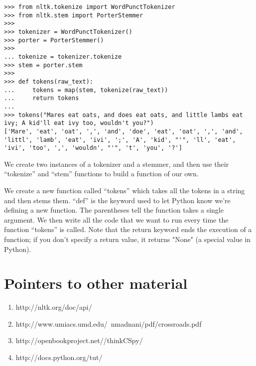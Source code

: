 \documentclass[12pt]{article}
\newenvironment{mylisting}
{\begin{list}{}{\setlength{\leftmargin}{1em}}\item\scriptsize\bfseries}
{\end{list}}
\begin{document}
\begin{mylisting}
\begin{verbatim}
>>> from nltk.tokenize import WordPunctTokenizer
>>> from nltk.stem import PorterStemmer
>>> 
>>> tokenizer = WordPunctTokenizer()
>>> porter = PorterStemmer()
>>>     
... tokenize = tokenizer.tokenize
>>> stem = porter.stem
>>> 
>>> def tokens(raw_text):
...     tokens = map(stem, tokenize(raw_text))
...     return tokens
... 
>>> tokens("Mares eat oats, and does eat oats, and little lambs eat ivy; A kid'll eat ivy too, wouldn't you?")
['Mare', 'eat', 'oat', ',', 'and', 'doe', 'eat', 'oat', ',', 'and', 'littl', 'lamb', 'eat', 'ivi', ';', 'A', 'kid', "'", 'll', 'eat', 'ivi', 'too', ',', 'wouldn', "'", 't', 'you', '?']
\end{verbatim}
\end{mylisting}

We create two instances of a tokenizer and a stemmer, and then use their ``tokenize'' and ``stem'' functions to build a function of our own.  

  We create a new function called ``tokens'' which takes all the tokens in a string and then stems them.  ``def'' is the keyword used to let Python know we're defining a new function.  The parentheses tell the function takes a single argument.  We then write all the code that we want to run every time the function ``tokens'' is called.  Note that the return keyword ends the execution of a function; if you don't specify a return value, it returns "None" (a special value in Python).
  
\section{Pointers to other material}

\begin{enumerate}
\item http://nltk.org/doc/api/
\item http://www.umiacs.umd.edu/~nmadnani/pdf/crossroads.pdf
\item http://openbookproject.net//thinkCSpy/
\item http://docs.python.org/tut/ 
\end{enumerate}
\end{document}
